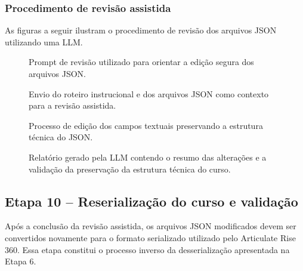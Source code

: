 \documentclass[12pt,a4paper]{article}
\begin{document}
\subsubsection*{Procedimento de revisão assistida}

As figuras a seguir ilustram o procedimento de revisão dos arquivos JSON utilizando uma LLM.

\begin{figure}[H]
    \centering
    \fbox{\rule{0pt}{7cm}\rule{0.95\textwidth}{0pt}}
    \caption{Prompt de revisão utilizado para orientar a edição segura dos arquivos JSON.}
    \label{fig:revisao01}
\end{figure}

\begin{figure}[H]
    \centering
    \fbox{\rule{0pt}{7cm}\rule{0.95\textwidth}{0pt}}
    \caption{Envio do roteiro instrucional e dos arquivos JSON como contexto para a revisão assistida.}
    \label{fig:revisao02}
\end{figure}

\begin{figure}[H]
    \centering
    \fbox{\rule{0pt}{7cm}\rule{0.95\textwidth}{0pt}}
    \caption{Processo de edição dos campos textuais preservando a estrutura técnica do JSON.}
    \label{fig:revisao03}
\end{figure}

\begin{figure}[H]
    \centering
    \fbox{\rule{0pt}{7cm}\rule{0.95\textwidth}{0pt}}
    \caption{Relatório gerado pela LLM contendo o resumo das alterações e a validação da preservação da estrutura técnica do curso.}
    \label{fig:revisao04}
\end{figure}

\subsection{Etapa 10 -- Reserialização do curso e validação}

Após a conclusão da revisão assistida, os arquivos JSON modificados devem ser convertidos novamente para o formato serializado utilizado pelo Articulate Rise 360. Essa etapa constitui o processo inverso da desserialização apresentada na Etapa 6.
\end{document}
